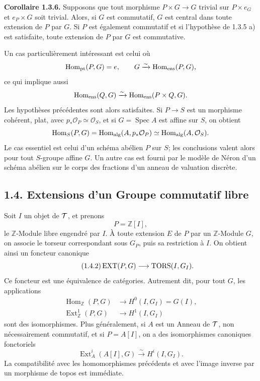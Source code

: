 \documentclass[11pt]{article}
\providecommand{\Spec}{\operatorname{Spec}}
\providecommand{\cO}{\mathcal O}
\providecommand{\Z}{\mathbb Z}
\providecommand{\Hom}{\operatorname{Hom}}
\begin{document}
\textbf{Corollaire 1.3.6.}  Supposons que tout morphisme \(P\times G\to G\) trivial sur \(P\times e_G\) et \(e_P\times G\) soit trivial.  Alors, si \(G\) est commutatif, \(G\) est central dans toute extension de \(P\) par \(G\).  Si \(P\) est également commutatif et si l'hypothèse de 1.3.5 a) est satisfaite, toute extension de \(P\) par \(G\) est commutative.

Un cas particulièrement intéressant est celui où
\[
  \operatorname{Hom}_{\mathrm{pt}}(P,G)=e,\qquad
  G\xrightarrow{\sim}\operatorname{Hom}_{\mathrm{ens}}(P,G),
\]
ce qui implique aussi
\[
  \operatorname{Hom}_{\mathrm{ens}}(Q,G)\xrightarrow{\sim}\operatorname{Hom}_{\mathrm{ens}}(P\times Q,G).
\]
Les hypothèses précédentes sont alors satisfaites.  Si \(P\to S\) est un morphisme cohérent, plat, avec \(p_*\cO_P\simeq\cO_S\), et si \(G=\Spec A\) est affine sur \(S\), on obtient
\[
  \Hom_S(P,G)=\Homalg(A,p_*\cO_P)\simeq\Homalg(A,\cO_S).
\]
Le cas essentiel est celui d'un schéma abélien \(P\) sur \(S\); les conclusions valent alors pour tout \(S\)-groupe affine \(G\).  Un autre cas est fourni par le modèle de Néron d'un schéma abélien sur le corps des fractions d'un anneau de valuation discrète.

\subsection*{1.4. Extensions d'un Groupe commutatif libre}

Soit \(I\) un objet de \(\mathcal T\), et prenons
\[
  P=\Z[I],
\]
le \(\Z\)-Module libre engendré par \(I\).  À toute extension \(E\) de \(P\) par un \(\Z\)-Module \(G\), on associe le torseur correspondant sous \(G_P\), puis sa restriction à \(I\).  On obtient ainsi un foncteur canonique
\begin{equation}\tag{1.4.2}
  \operatorname{EXT}(P,G)\longrightarrow \operatorname{TORS}(I,G_I).
\end{equation}
Ce foncteur est une équivalence de catégories.  Autrement dit, pour tout \(G\), les applications
\begin{align}
  \Hom_{\Z}(P,G)&\longrightarrow H^0(I,G_I)=G(I), \tag{1.4.3}\\
  \operatorname{Ext}^{1}_{\Z}(P,G)&\longrightarrow H^1(I,G_I) \tag{1.4.4}
\end{align}
sont des isomorphismes.  Plus généralement, si \(A\) est un Anneau de \(\mathcal T\), non nécessairement commutatif, et si \(P=A[I]\), on a des isomorphismes canoniques fonctoriels
\[
  \operatorname{Ext}^{i}_{A}(A[I],G)\xrightarrow{\sim}H^i(I,G_I).
\]
La compatibilité avec les homomorphismes précédents et avec l'image inverse par un morphisme de topos est immédiate.
\end{document}
